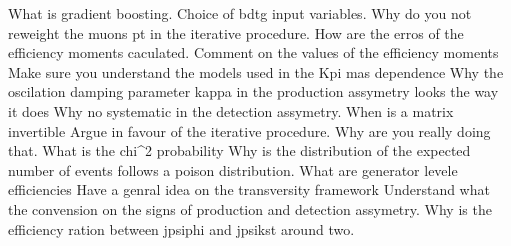 
What is gradient boosting.
Choice of bdtg input variables.
Why do you not reweight the muons pt in the iterative procedure.
How are the erros of the efficiency moments caculated. 
Comment on the values of the efficiency moments
Make sure you understand the models used in the Kpi mas dependence
Why the oscilation damping parameter kappa in the production assymetry looks the way it does 
Why no systematic in the detection assymetry.
When is a matrix invertible
Argue in favour of the iterative procedure. Why are you really doing that.
What is the chi^2 probability
Why is the distribution of the expected number of events follows a poison distribution.
What are generator levele efficiencies
Have a genral idea on the transversity framework
Understand what the convension on the signs of production and detection assymetry.
Why is the efficiency ration between jpsiphi and jpsikst around two.
